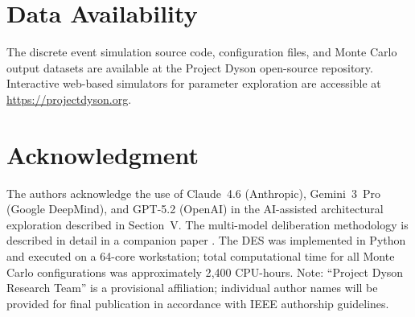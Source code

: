 \documentclass[journal]{IEEEtran}
\begin{document}
\section*{Data Availability}

The discrete event simulation source code, configuration files, and Monte Carlo output datasets are available at the Project Dyson open-source repository. Interactive web-based simulators for parameter exploration are accessible at \url{https://projectdyson.org}.

\section*{Acknowledgment}

The authors acknowledge the use of Claude~4.6 (Anthropic), Gemini~3~Pro (Google DeepMind), and GPT-5.2 (OpenAI) in the AI-assisted architectural exploration described in Section~V. The multi-model deliberation methodology is described in detail in a companion paper \cite{dyson_multimodel}. The DES was implemented in Python and executed on a 64-core workstation; total computational time for all Monte Carlo configurations was approximately 2{,}400 CPU-hours. Note: ``Project Dyson Research Team'' is a provisional affiliation; individual author names will be provided for final publication in accordance with IEEE authorship guidelines.
\end{document}

